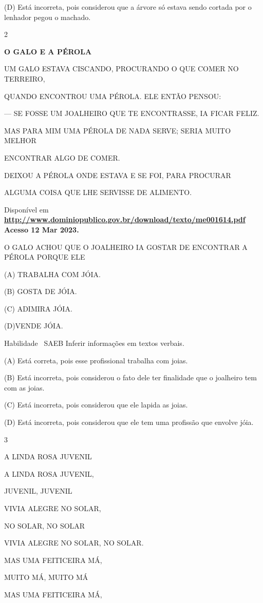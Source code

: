 {{{{{{(D) Está incorreta, pois considerou que a árvore só estava sendo cortada
por o lenhador pegou o machado.

\num{2}

\textbf{O GALO E A PÉROLA}

UM GALO ESTAVA CISCANDO, PROCURANDO O QUE COMER NO TERREIRO,

QUANDO ENCONTROU UMA PÉROLA. ELE ENTÃO PENSOU:

--- SE FOSSE UM JOALHEIRO QUE TE ENCONTRASSE, IA FICAR FELIZ.

MAS PARA MIM UMA PÉROLA DE NADA SERVE; SERIA MUITO MELHOR

ENCONTRAR ALGO DE COMER.

DEIXOU A PÉROLA ONDE ESTAVA E SE FOI, PARA PROCURAR

ALGUMA COISA QUE LHE SERVISSE DE ALIMENTO.

Disponível em
\textbf{\url{http://www.dominiopublico.gov.br/download/texto/me001614.pdf}
Acesso 12 Mar 2023.}

O GALO ACHOU QUE O JOALHEIRO IA GOSTAR DE ENCONTRAR A PÉROLA PORQUE ELE

(A) TRABALHA COM JÓIA.

(B) GOSTA DE JÓIA.

(C) ADIMIRA JÓIA.

(D)VENDE JÓIA.

\protect\hypertarget{_Hlk129237824}{}{}Habilidade ~SAEB Inferir
informações em textos verbais.

\protect\hypertarget{_Hlk129241484}{}{}(A) Está correta, pois esse
profissional trabalha com joias.

(B) Está incorreta, pois considerou o fato dele ter finalidade que o
joalheiro tem com as joias.

(C) Está incorreta, pois considerou que ele lapida as joias.

(D) Está incorreta, pois considerou que ele tem uma profissão que
envolve jóia.

\num{3}

A LINDA ROSA JUVENIL

A LINDA ROSA JUVENIL,

JUVENIL, JUVENIL

VIVIA ALEGRE NO SOLAR,

NO SOLAR, NO SOLAR

VIVIA ALEGRE NO SOLAR, NO SOLAR.

MAS UMA FEITICEIRA MÁ,

MUITO MÁ, MUITO MÁ

MAS UMA FEITICEIRA MÁ,

}}}}}}
